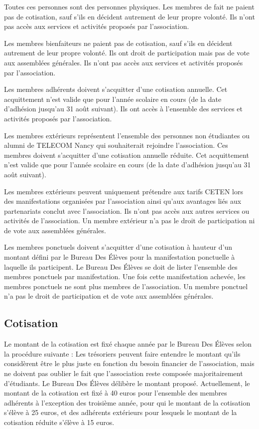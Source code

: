 \documentclass{article} %
\begin{document}
			Toutes ces personnes sont des personnes physiques. Les membres de
			fait ne paient pas de cotisation, sauf s’ils en décident autrement
			de leur propre volonté. Ils n’ont pas accès aux services et
			activités proposés par l’association.

			Les membres bienfaiteurs ne paient pas de cotisation, sauf s’ils en
			décident autrement de leur propre volonté. Ils ont droit de
			participation mais pas de vote aux assemblées générales. Ils n’ont
			pas accès aux services et activités proposés par l’association.

			Les membres adhérents doivent s’acquitter d’une cotisation annuelle.
			Cet acquittement n’est valide que pour l’année scolaire en cours
			(de la date d’adhésion jusqu’au 31 août suivant). Ils ont accès à
			l’ensemble des services et activités proposés par l’association.

			Les membres extérieurs représentent l’ensemble des personnes non
			étudiantes ou alumni de TELECOM Nancy qui souhaiterait rejoindre
			l’association. Ces membres doivent s’acquitter d’une cotisation
			annuelle réduite. Cet acquittement n’est valide que pour l’année
			scolaire en cours (de la date d’adhésion jusqu’au 31 août suivant).

			Les membres extérieurs peuvent uniquement prétendre aux tarifs CETEN
			lors des manifestations organisées par l’association ainsi qu’aux
			avantages liés aux partenariats conclut avec l’association. Ils
			n’ont pas accès aux autres services ou activités de l’association.
			Un membre extérieur n’a pas le droit de participation ni de vote aux
			assemblées générales.

			Les membres ponctuels doivent s’acquitter d’une cotisation à hauteur
			d’un montant défini par le Bureau Des Élèves pour la manifestation
			ponctuelle à laquelle ils participent. Le Bureau Des Élèves se doit
			de lister l’ensemble des membres ponctuels par manifestation. Une
			fois cette manifestation achevée, les membres ponctuels ne sont plus
			membres de l’association. Un membre ponctuel n’a pas le droit de
			participation et de vote aux assemblées générales.

		\subsection{Cotisation}

			Le montant de la cotisation est fixé chaque année par le Bureau Des
			Élèves selon la procédure suivante : Les trésoriers peuvent faire
			entendre le montant qu’ils considèrent être le plus juste en
			fonction du besoin financier de l’association, mais ne doivent pas
			oublier le fait que l’association reste composée majoritairement
			d'étudiants. Le Bureau Des Élèves délibère le montant proposé.
			Actuellement, le montant de la cotisation est fixé à 40 euros pour
			l’ensemble des membres adhérents à l’exception des troisième année,
			pour qui le montant de la cotisation s’élève à 25 euros, et des
			adhérents extérieurs pour lesquels le montant de la cotisation
			réduite s’élève à 15 euros.
\end{document}
